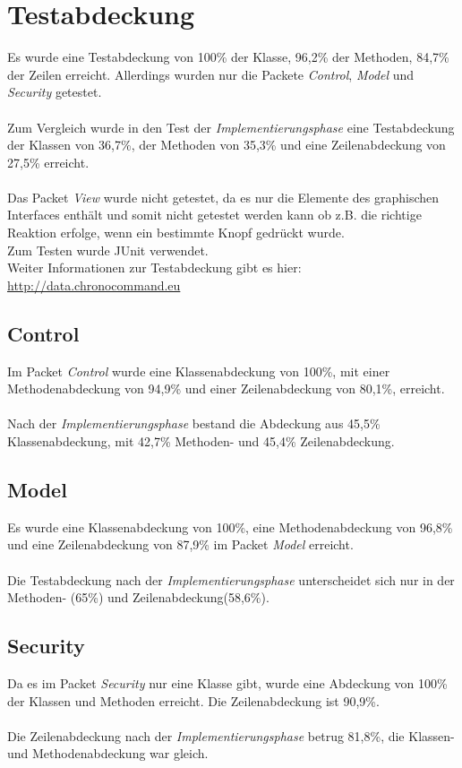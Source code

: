\section{Testabdeckung}
Es wurde eine Testabdeckung von 100\% der Klasse, 96,2\% der Methoden, 84,7\% der Zeilen erreicht. Allerdings wurden nur die Packete \emph{Control}, \emph{Model} und \emph{Security} getestet.\\\\
Zum Vergleich wurde in den Test der \emph{Implementierungsphase} eine Testabdeckung der Klassen von 36,7\%, der Methoden von 35,3\% und eine Zeilenabdeckung von 27,5\% erreicht.
\\\\
Das Packet \emph{View} wurde nicht getestet, da es nur die Elemente des graphischen Interfaces enthält und somit nicht getestet werden kann ob z.B. die richtige Reaktion erfolge, wenn ein bestimmte Knopf gedrückt wurde.\\

Zum Testen wurde JUnit verwendet.\\
Weiter Informationen zur Testabdeckung gibt es hier:\\ \url{http://data.chronocommand.eu}

\subsection{Control}
Im Packet \emph{Control} wurde eine Klassenabdeckung von 100\%, mit einer Methodenabdeckung von 94,9\% und einer Zeilenabdeckung von 80,1\%, erreicht.\\\\
Nach der \emph{Implementierungsphase} bestand die Abdeckung aus 45,5\% Klassenabdeckung, mit 42,7\% Methoden- und 45,4\% Zeilenabdeckung.

\subsection{Model}
Es wurde eine Klassenabdeckung von 100\%, eine Methodenabdeckung von 96,8\% und eine Zeilenabdeckung von 87,9\% im Packet \emph{Model} erreicht.\\\\
Die Testabdeckung nach der \emph{Implementierungsphase} unterscheidet sich nur in der Methoden- (65\%) und Zeilenabdeckung(58,6\%).

\subsection{Security}
Da es im Packet \emph{Security} nur eine Klasse gibt, wurde eine Abdeckung von 100\% der Klassen und Methoden erreicht. Die Zeilenabdeckung ist 90,9\%.\\\\
Die Zeilenabdeckung nach der \emph{Implementierungsphase} betrug 81,8\%, die Klassen- und Methodenabdeckung war gleich.
